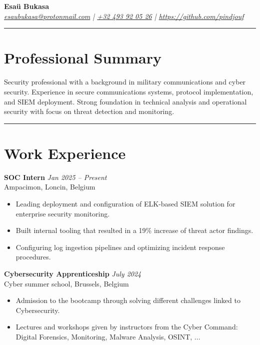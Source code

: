 \documentclass[a4paper,10pt]{article}
\begin{document}
\begin{center}
    {\LARGE \textbf{Esaü Bukasa}} \\
    \vspace{2pt}
    \textit{\href{mailto:esaubukasa@protonmail.com}{esaubukasa@protonmail.com} | \href{tel:+32 493 92 05 26}{+32 493 92 05 26} | \href{https://github.com/pindjouf}{https://github.com/pindjouf}}
\end{center}

\vspace{-2pt}
\hrule
\vspace{-8pt}

\section*{Professional Summary}
\vspace{-5pt}
Security professional with a background in military communications and cyber security. Experience in secure communications systems, protocol implementation, and SIEM deployment. Strong foundation in technical analysis and operational security with focus on threat detection and monitoring.

\vspace{8pt}\hrule

\section*{Work Experience}

\textbf{SOC Intern} \hfill \textit{Jan 2025 – Present} \\
Ampacimon, Loncin, Belgium
\begin{itemize}
    \item Leading deployment and configuration of ELK-based SIEM solution for enterprise security monitoring.
    \item Built internal tooling that resulted in a 19\% increase of threat actor findings.
    \item Configuring log ingestion pipelines and optimizing incident response procedures.
\end{itemize}
\vspace{8pt}

\noindent\textbf{Cybersecurity Apprenticeship} \hfill \textit{July 2024} \\
Cyber summer school, Brussels, Belgium
\begin{itemize}
    \item Admission to the bootcamp through solving different challenges linked to Cybersecurity.
    \item Lectures and workshops given by instructors from the Cyber Command: Digital Forensics, Monitoring, Malware Analysis, OSINT, ...
\end{itemize}
\vspace{8pt}
\end{document}
